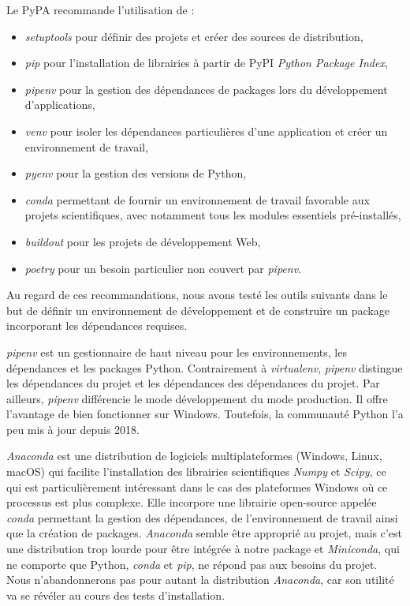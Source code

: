 \documentclass[twoside,a4paper,11pt,frenchb,openany]{report}
\begin{document}
	Le PyPA recommande l'utilisation de :
\begin{itemize}
\item \textit{setuptools} pour définir des projets et créer des sources de distribution,
\item \textit{pip} pour l'installation de librairies à partir de PyPI \textit{Python Package Index},
\item \textit{pipenv} pour la gestion des dépendances de packages lors du développement d'applications,
\item \textit{venv} pour isoler les dépendances particulières d'une application et créer un environnement de travail,
\item \textit{pyenv} pour la gestion des versions de Python,
\item \textit{conda} permettant de fournir un environnement de travail favorable aux projets scientifiques, avec notamment tous les modules essentiels pré-installés,
\item \textit{buildout} pour les projets de développement Web,
\item \textit{poetry} pour un besoin particulier non couvert par \textit{pipenv}.

\end{itemize}

Au regard de ces recommandations, nous avons testé les outils suivants dans le but de définir un environnement de développement et de construire un package incorporant les dépendances requises.

\textit{pipenv} est un gestionnaire de haut niveau pour les environnements, les dépendances et les packages Python. Contrairement à \textit{virtualenv}, \textit{pipenv} distingue les dépendances du projet et les dépendances des dépendances du projet. Par ailleurs, \textit{pipenv} différencie le mode développement du mode production. Il offre l'avantage de bien fonctionner sur Windows. Toutefois, la communauté Python l'a peu mis à jour depuis 2018.

\textit{Anaconda} est une distribution de logiciels multiplateformes (Windows, Linux, macOS) qui facilite l'installation des librairies scientifiques \textit{Numpy} et \textit{Scipy}, ce qui est particulièrement intéressant dans le cas des plateformes Windows où ce processus est plus complexe. Elle incorpore une librairie open-source appelée \textit{conda} permettant la gestion des dépendances, de l'environnement de travail ainsi que la création de packages. \textit{Anaconda} semble être approprié au projet, mais c'est une distribution trop lourde pour être intégrée à notre package et \textit{Miniconda}, qui ne comporte que Python, \textit{conda} et \textit{pip}, ne répond pas aux besoins du projet. Nous n'abandonnerons pas pour autant la distribution \textit{Anaconda}, car son utilité va se révéler au cours des tests d'installation. 
\end{document}
